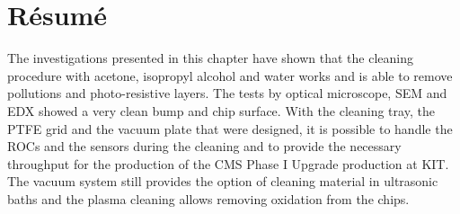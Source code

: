 \section{R\'{e}sum\'{e}}
The investigations presented in this chapter have shown that the cleaning procedure with acetone, isopropyl alcohol and water works and is able to remove pollutions and photo-resistive layers. The tests by optical microscope, \ac{SEM} and \ac{EDX} showed a very clean bump and chip surface. With the cleaning tray, the \ac{PTFE} grid and the vacuum plate that were designed, it is possible to handle the \acs{ROC}s and the sensors during the cleaning and to provide the necessary throughput for the production of the \ac{CMS} Phase I Upgrade production at \ac{KIT}. The vacuum system still provides the option of cleaning material in ultrasonic baths and the plasma cleaning allows removing oxidation from the chips.

